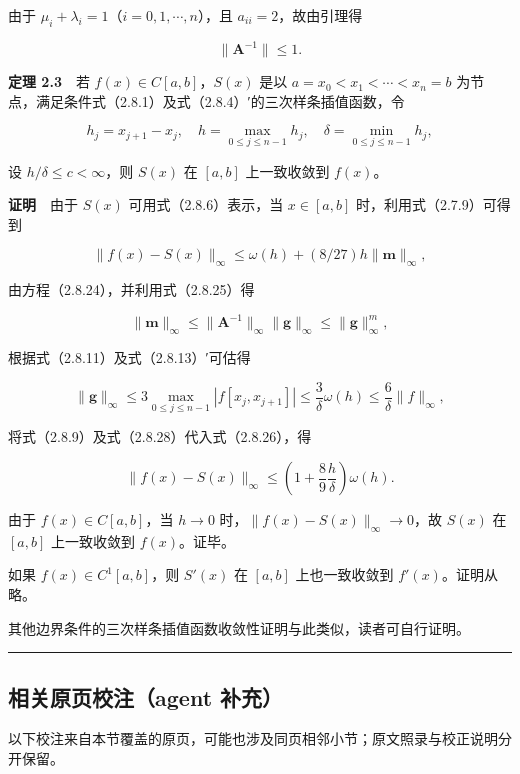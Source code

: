 \documentclass[
  10pt,
  fontset=fandol]{ctexart}
\begin{document}
由于 \(\mu_i+\lambda_i=1\)（\(i=0,1,\cdots,n\)），且 \(a_{ii}=2\)，故由引理得

\[\|\boldsymbol A^{-1}\|\leqslant1.\tag{2.8.25}\]

\textbf{定理 2.3}　若 \(f(x)\in C[a,b]\)，\(S(x)\) 是以 \(a=x_0<x_1<\cdots<x_n=b\) 为节点，满足条件式（2.8.1）及式（2.8.4）′的三次样条插值函数，令

\[h_j=x_{j+1}-x_j,\quad h=\max_{0\leqslant j\leqslant n-1}h_j,\quad\delta=\min_{0\leqslant j\leqslant n-1}h_j,\]

设 \(h/\delta\leqslant c<\infty\)，则 \(S(x)\) 在 \([a,b]\) 上一致收敛到 \(f(x)\)。

\textbf{证明}　由于 \(S(x)\) 可用式（2.8.6）表示，当 \(x\in[a,b]\) 时，利用式（2.7.9）可得到

\[\|f(x)-S(x)\|_\infty\leqslant\omega(h)+(8/27)h\|\boldsymbol m\|_\infty,\tag{2.8.26}\]

由方程（2.8.24），并利用式（2.8.25）得

\[\|\boldsymbol m\|_\infty\leqslant\|\boldsymbol A^{-1}\|_\infty\|\boldsymbol g\|_\infty\leqslant\|\boldsymbol g\|_\infty^m,\tag{2.8.27}\]

根据式（2.8.11）及式（2.8.13）′可估得

\[\|\boldsymbol g\|_\infty\leqslant3\max_{0\leqslant j\leqslant n-1}|f[x_j,x_{j+1}]|\leqslant\frac3\delta\omega(h)\leqslant\frac6\delta\|f\|_\infty,\tag{2.8.28}\]

将式（2.8.9）及式（2.8.28）代入式（2.8.26），得

\[\|f(x)-S(x)\|_\infty\leqslant\left(1+\frac89\frac h\delta\right)\omega(h).\]

由于 \(f(x)\in C[a,b]\)，当 \(h\to0\) 时，\(\|f(x)-S(x)\|_\infty\to0\)，故 \(S(x)\) 在 \([a,b]\) 上一致收敛到 \(f(x)\)。证毕。

如果 \(f(x)\in C^1[a,b]\)，则 \(S'(x)\) 在 \([a,b]\) 上也一致收敛到 \(f'(x)\)。证明从略。

其他边界条件的三次样条插值函数收敛性证明与此类似，读者可自行证明。

\begin{center}\rule{0.5\linewidth}{0.5pt}\end{center}

\subsection{相关原页校注（agent 补充）}\label{ux76f8ux5173ux539fux9875ux6821ux6ce8agent-ux8865ux5145}

以下校注来自本节覆盖的原页，可能也涉及同页相邻小节；原文照录与校正说明分开保留。
\end{document}
